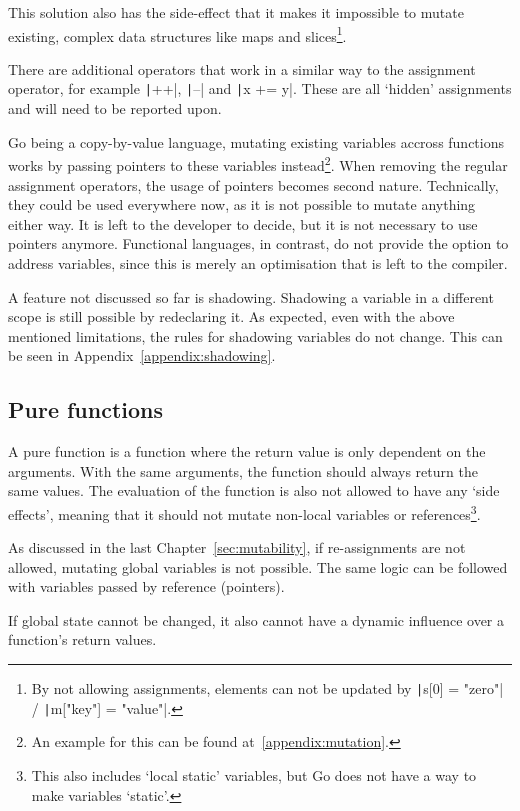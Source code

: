 This solution also has the side-effect that it makes it impossible to mutate
existing, complex data structures like maps and slices\footnote{By not
    allowing assignments, elements can not be updated by
\texttt|s[0] = "zero"| / \texttt|m["key"] = "value"|.}.

There are additional operators that work in a similar way to the assignment
operator, for example \texttt|++|, \texttt|--| and
\texttt|x += y|. These are all `hidden' assignments and will need to
be reported upon.

Go being a \gls{copy-by-value} language, mutating existing variables
accross functions works by passing pointers to these variables instead\footnote{
An example for this can be found at~\ref{appendix:mutation}.}.
When removing the regular assignment operators, the usage of pointers becomes
second nature. Technically, they could be used everywhere now, as it is not
possible to mutate anything either way. It is left to the developer to decide,
but it is not necessary to use pointers anymore. Functional languages, in contrast,
do not provide the option to address variables, since this is merely an optimisation
that is left to the compiler.

A feature not discussed so far is shadowing. Shadowing a variable in a different
scope is still possible by redeclaring it. As expected, even with the above
mentioned limitations, the rules for shadowing variables do not change. This
can be seen in Appendix~\ref{appendix:shadowing}.

\subsection{Pure functions}

A pure function is a function where the return value is only dependent on
the arguments. With the same arguments, the function should always return
the same values. The evaluation of the function is also not allowed to have
any `side effects', meaning that it should not mutate non-local variables or
references\footnote{This also includes `local static' variables, but Go does
not have a way to make variables `static'.}.

As discussed in the last Chapter~\ref{sec:mutability}, if re-assignments
are not allowed, mutating global variables is not possible. The same logic
can be followed with variables passed by reference (pointers).

If global state cannot be changed, it also cannot have a dynamic influence
over a function's return values.

